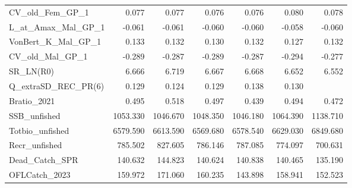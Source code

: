 \documentclass[11pt,
  english,
  a4paper,
]{article}
\begin{document}
\begin{table}
{\begin{tabular}[t]{lrrrrrr}
CV\_old\_Fem\_GP\_1 & 0.077 & 0.077 & 0.076 & 0.076 & 0.080 & 0.078\\
L\_at\_Amax\_Mal\_GP\_1 & -0.061 & -0.061 & -0.060 & -0.060 & -0.058 & -0.060\\
VonBert\_K\_Mal\_GP\_1 & 0.133 & 0.132 & 0.130 & 0.132 & 0.127 & 0.132\\
CV\_old\_Mal\_GP\_1 & -0.289 & -0.287 & -0.289 & -0.287 & -0.294 & -0.277\\
SR\_LN(R0) & 6.666 & 6.719 & 6.667 & 6.668 & 6.652 & 6.552\\
Q\_extraSD\_REC\_PR(6) & 0.129 & 0.124 & 0.129 & 0.138 & 0.130 & \\
Bratio\_2021 & 0.495 & 0.518 & 0.497 & 0.439 & 0.494 & 0.472\\
SSB\_unfished & 1053.330 & 1046.670 & 1048.350 & 1046.180 & 1064.390 & 1138.710\\
Totbio\_unfished & 6579.590 & 6613.590 & 6569.680 & 6578.540 & 6629.030 & 6849.680\\
Recr\_unfished & 785.502 & 827.605 & 786.146 & 787.085 & 774.097 & 700.631\\
Dead\_Catch\_SPR & 140.632 & 144.823 & 140.624 & 140.838 & 140.465 & 135.190\\
OFLCatch\_2023 & 159.972 & 171.060 & 160.235 & 143.898 & 158.941 & 152.523\\
\bottomrule
\end{tabular}}
\end{table}
\end{document}
